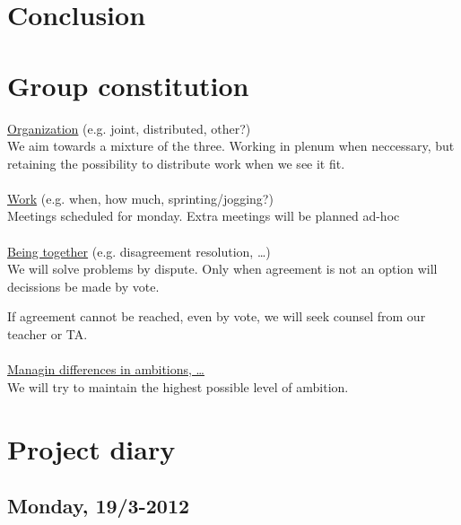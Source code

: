 \documentclass[a4paper,11pt]{article}
\begin{document}
\pagebreak
\section{Conclusion}
\label{sec:Conclusion}


\pagebreak
\appendix
\section{Group constitution}
\underline{Organization} (e.g. joint, distributed, other?) \\
We aim towards a mixture of the three. Working in plenum when neccessary, but retaining the possibility to distribute work when we see it fit. \\ \\
\underline{Work} (e.g. when, how much, sprinting/jogging?) \\
Meetings scheduled for monday.
Extra meetings will be planned ad-hoc \\ \\
\underline{Being together} (e.g. disagreement resolution, \ldots) \\
We will solve problems by dispute. Only when agreement is not an option will decissions be made by vote.

If agreement cannot be reached, even by vote, we will seek counsel from our teacher or TA. \\ \\
\underline{Managin differences in ambitions, \ldots} \\
We will try to maintain the highest possible level of ambition. \\

\pagebreak
\section{Project diary}

\subsection{Monday, 19/3-2012}
\end{document}
